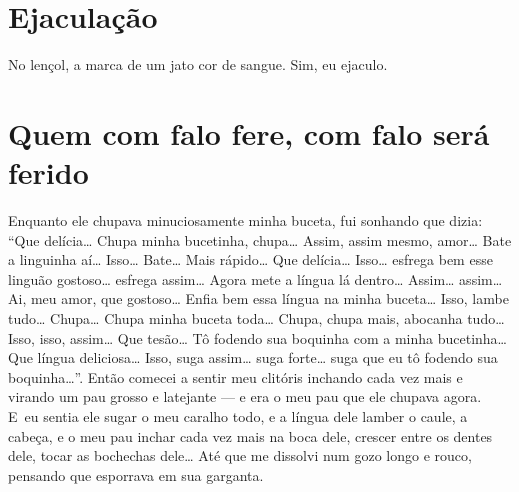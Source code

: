 \chapter{Ejaculação}

No lençol, a marca de um jato cor de sangue. Sim, eu ejaculo.

\chapter{Quem com falo fere, com falo será ferido}

Enquanto ele chupava minuciosamente minha buceta, fui sonhando que
dizia: ``Que delícia… Chupa minha bucetinha, chupa… Assim, assim mesmo, amor…
Bate a linguinha aí… Isso… Bate… Mais rápido… Que
delícia… Isso… esfrega bem esse linguão gostoso…
esfrega assim… Agora mete a língua lá dentro…
Assim… assim… Ai, meu amor, que gostoso… Enfia bem
essa língua na minha buceta… Isso, lambe tudo…
Chupa… Chupa minha buceta toda… Chupa, chupa mais,
abocanha tudo… Isso, isso, assim… Que tesão… Tô
fodendo sua boquinha com a minha bucetinha… Que língua
deliciosa… Isso, suga assim… suga forte… suga que
eu tô fodendo sua boquinha…''. Então comecei a sentir meu
clitóris inchando cada vez mais e virando um pau grosso e latejante ---
e era o meu pau que ele chupava agora. E~eu sentia ele sugar o meu
caralho todo, e a língua dele lamber o caule, a cabeça, e o meu pau
inchar cada vez mais na boca dele, crescer entre os dentes dele, tocar
as bochechas dele… Até que me dissolvi num gozo longo e rouco,
pensando que esporrava em sua garganta.

